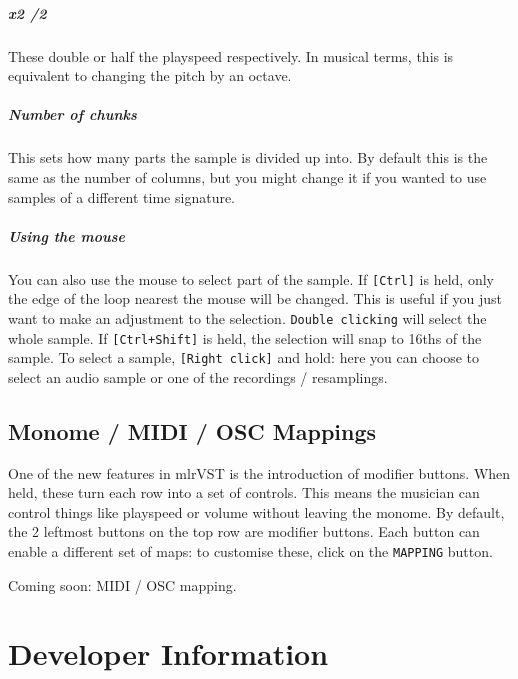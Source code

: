 \documentclass[10pt,a4paper]{report}
\begin{document}
\paragraph{x2 /2} These double or half the playspeed respectively. In musical terms, this is equivalent to changing the pitch by an octave.

\paragraph{Number of chunks} This sets how many parts the sample is divided up into. By default this is the same as the number of columns, but you might change it if you wanted to use samples of a different time signature.

\paragraph{Using the mouse} You can also use the mouse to select part of the sample. If \texttt{[Ctrl]} is held, only the edge of the loop nearest the mouse will be changed. This is useful if you just want to make an adjustment to the selection. \texttt{Double clicking} will select the whole sample. If \texttt{[Ctrl+Shift]} is held, the selection will snap to 16ths of the sample. To select a sample, \texttt{[Right click]} and hold: here you can choose to select an audio sample or one of the recordings / resamplings.



\section{Monome / MIDI / OSC Mappings}
\label{sec:mappings}

One of the new features in mlrVST is the introduction of modifier buttons. When held, these turn each row into a set of controls. This means the musician can control things like playspeed or volume without leaving the monome. By default, the 2 leftmost buttons on the top row are modifier buttons. Each button can enable a different set of maps: to customise these, click on the \texttt{MAPPING} button.


Coming soon: MIDI / OSC mapping.





\chapter{Developer Information}
\label{sec:dev}
\end{document}
